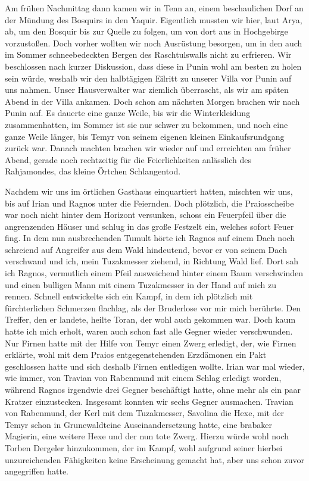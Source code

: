 Am frühen Nachmittag dann kamen wir in Tenn an, einem beschaulichen Dorf an der Mündung des Bosquirs in den Yaquir. Eigentlich mussten wir hier, laut Arya, ab, um den Bosquir bis zur Quelle zu folgen, um von dort aus in Hochgebirge vorzustoßen. Doch vorher wollten wir noch Ausrüstung besorgen, um in den auch im Sommer schneebedeckten Bergen des Raschtulswalls nicht zu erfrieren. Wir beschlossen nach kurzer Diskussion, dass diese in Punin wohl am besten zu holen sein würde, weshalb wir den halbtägigen Eilritt zu unserer Villa vor Punin auf uns nahmen. Unser Hausverwalter war ziemlich überrascht, als wir am späten Abend in der Villa ankamen. Doch schon am nächsten Morgen brachen wir nach Punin auf. Es dauerte eine ganze Weile, bis wir die Winterkleidung zusammenhatten, im Sommer ist sie nur schwer zu bekommen, und noch eine ganze Weile länger, bis Temyr von seinem eigenen kleinen Einkaufsrundgang zurück war. Danach machten brachen wir wieder auf und erreichten am früher Abend, gerade noch rechtzeitig für die Feierlichkeiten anlässlich des Rahjamondes, das kleine Örtchen Schlangentod. 

Nachdem wir uns im örtlichen Gasthaus einquartiert hatten, mischten wir uns, bis auf Irian und Ragnos unter die Feiernden. Doch plötzlich, die Praiosscheibe war noch nicht hinter dem Horizont versunken, schoss ein Feuerpfeil über die angrenzenden Häuser und schlug in das große Festzelt ein, welches sofort Feuer fing. In dem nun ausbrechenden Tumult hörte ich Ragnos auf einem Dach noch schreiend auf Angreifer aus dem Wald hindeutend, bevor er von seinem Dach verschwand und ich, mein Tuzakmesser ziehend, in Richtung Wald lief. Dort sah ich Ragnos, vermutlich einem Pfeil ausweichend hinter einem Baum verschwinden und einen bulligen Mann mit einem Tuzakmesser in der Hand auf mich zu rennen. Schnell entwickelte sich ein Kampf, in dem ich plötzlich mit fürchterlichen Schmerzen flachlag, als der Bruderlose vor mir mich berührte. Den Treffer, den er landete, heilte Toran, der wohl auch gekommen war. Doch kaum hatte ich mich erholt, waren auch schon fast alle Gegner wieder verschwunden. Nur Firnen hatte mit der Hilfe von Temyr einen Zwerg erledigt, der, wie Firnen erklärte, wohl mit dem Praios entgegenstehenden Erzdämonen ein Pakt geschlossen hatte und sich deshalb Firnen entledigen wollte. Irian war mal wieder, wie immer, von Travian von Rabenmund mit einem Schlag erledigt worden, während Ragnos irgendwie drei Gegner beschäftigt hatte, ohne mehr als ein paar Kratzer einzustecken. Insgesamt konnten wir sechs Gegner ausmachen. Travian von Rabenmund, der Kerl mit dem Tuzakmesser, Savolina die Hexe, mit der Temyr schon in Grunewaldteine Auseinandersetzung hatte, eine brabaker Magierin, eine weitere Hexe und der nun tote Zwerg. Hierzu würde wohl noch Torben Dergeler hinzukommen, der im Kampf, wohl aufgrund seiner hierbei unzureichenden Fähigkeiten keine Erscheinung gemacht hat, aber uns schon zuvor angegriffen hatte.

